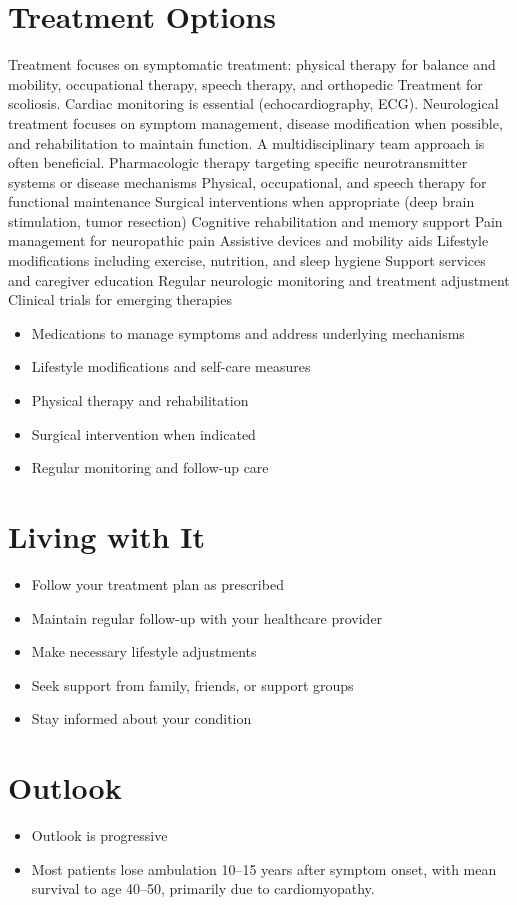 \section{Treatment Options}
Treatment focuses on symptomatic treatment: physical therapy for balance and mobility, occupational therapy, speech therapy, and orthopedic Treatment for scoliosis. Cardiac monitoring is essential (echocardiography, ECG). Neurological treatment focuses on symptom management, disease modification when possible, and rehabilitation to maintain function. A multidisciplinary team approach is often beneficial. Pharmacologic therapy targeting specific neurotransmitter systems or disease mechanisms Physical, occupational, and speech therapy for functional maintenance Surgical interventions when appropriate (deep brain stimulation, tumor resection) Cognitive rehabilitation and memory support Pain management for neuropathic pain Assistive devices and mobility aids Lifestyle modifications including exercise, nutrition, and sleep hygiene Support services and caregiver education Regular neurologic monitoring and treatment adjustment Clinical trials for emerging therapies

\begin{itemize}[noitemsep]
  \item Medications to manage symptoms and address underlying mechanisms
  \item Lifestyle modifications and self-care measures
  \item Physical therapy and rehabilitation
  \item Surgical intervention when indicated
  \item Regular monitoring and follow-up care
\end{itemize}
\section{Living with It}
\begin{itemize}[noitemsep]
  \item Follow your treatment plan as prescribed
  \item Maintain regular follow-up with your healthcare provider
  \item Make necessary lifestyle adjustments
  \item Seek support from family, friends, or support groups
  \item Stay informed about your condition
\end{itemize}
\section{Outlook}
\begin{itemize}[noitemsep]
  \item Outlook is progressive
  \item Most patients lose ambulation 10--15 years after symptom onset, with mean survival to age 40--50, primarily due to cardiomyopathy.
\end{itemize}
